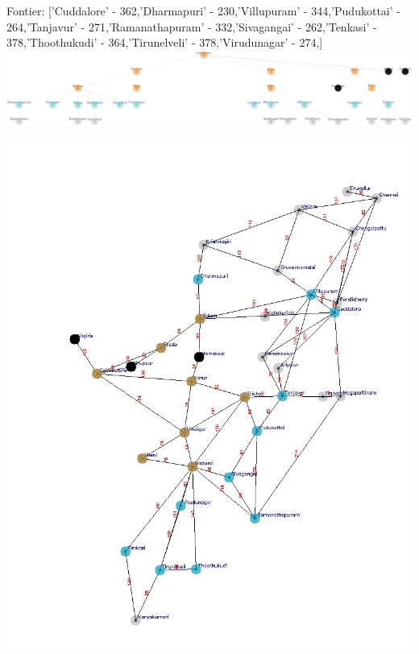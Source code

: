\documentclass[xcolor=table]{beamer}
\begin{document}
\begin{frame}
  { \tiny Fontier: ['Cuddalore' - 362,'Dharmapuri' - 230,'Villupuram' - 344,'Pudukottai' - 264,'Tanjavur' - 271,'Ramanathapuram' - 332,'Sivagangai' - 262,'Tenkasi' - 378,'Thoothukudi' - 364,'Tirunelveli' - 378,'Virudunagar' - 274,] }
  \includegraphics[width=1\textwidth]{../UCSNodes/16-1.png}
  \begin{center}
    \includegraphics[height=0.55\textheight]{../UCSoutput/tamilUCS14.jpg}
  \end{center}
\end{frame}
\end{document}
